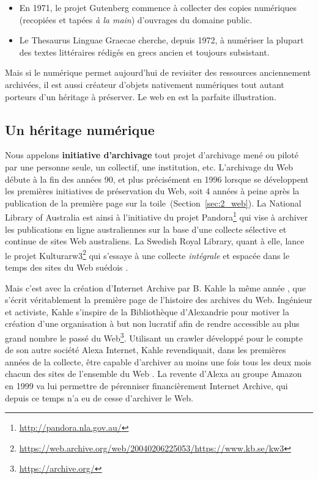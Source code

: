 \documentclass[symmetric,justified,marginals=raggedouter]{tufte-book}
\begin{document}
\begin{itemize}[leftmargin=*]  
\item En 1971, le projet Gutenberg commence à collecter des copies numéri\-ques (recopiées et tapées \textit{à la main}) d'ouvrages du domaine public.
\item Le Thesaurus Linguae Graecae cherche, depuis 1972, à numériser la plupart des textes littéraires rédigés en grecs ancien et toujours subsistant.
\end{itemize}

\noindent Mais si le numérique permet aujourd'hui de revisiter des ressources anciennement archivées, il est aussi créateur d'objets nativement numé\-riques tout autant porteurs d'un héritage à préserver. Le web en est la parfaite illustration.

\subsection{Un héritage numérique}

\noindent Nous appelons \textbf{initiative d'archivage} tout projet d'archivage mené ou piloté par une personne seule, un collectif, une institution, etc. L'archivage du Web débute à la fin des années 90, et plus précisément en 1996 lorsque se développent les premières initiatives de préservation du Web, soit 4 années à peine après la publication de la première page sur la toile~(Section~\ref{sec:2_web}). La National Library of Australia est ainsi à l'initiative du projet Pandora\footnote{\RaggedOuter \url{http://pandora.nla.gov.au/}} qui vise à archiver les publications en ligne australiennes sur la base d'une collecte sélective et continue de sites Web australiens. La Swedish Royal Library, quant à elle, lance le projet Kulturarw3\footnote{\RaggedOuter \url{https://web.archive.org/web/20040206225053/https://www.kb.se/kw3}} qui s'essaye à une collecte \textit{intégrale} et espacée dans le temps des sites du Web suédois \citep{arvidson_kulturarw3_2000}.

Mais c'est avec la création d'Internet Archive par B. Kahle la même année \citep{kahle_preserving_1997}, que s'écrit véritablement la première page de l'histoire des archives du Web. Ingénieur et activiste, Kahle s'inspire de la Bibliothèque d'Alexandrie pour motiver la création d'une organisation à but non lucratif afin de rendre accessible au plus grand nombre le passé du Web\footnote{\RaggedOuter \url{https://archive.org/}}. Utilisant un crawler développé pour le compte de son autre société Alexa Internet, Kahle revendiquait, dans les premières années de la collecte, être capable d'archiver au moins une fois tous les deux mois chacun des sites de l'ensemble du Web \citep{mohr_introduction_2004}. La revente d'Alexa au groupe Amazon en 1999 va lui permettre de pérenniser financièrement Internet Archive, qui depuis ce temps n'a eu de cesse d'archiver le Web.
\end{document}
